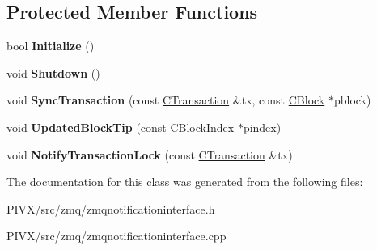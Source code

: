 \subsection*{Protected Member Functions}
\begin{DoxyCompactItemize}
\item 
\mbox{\label{class_c_z_m_q_notification_interface_a33097d2313d722ff02dd0f2c77f66d58}} 
bool {\bfseries Initialize} ()
\item 
\mbox{\label{class_c_z_m_q_notification_interface_a2eceddf8e9e3ac248ba922ef24eb8d3a}} 
void {\bfseries Shutdown} ()
\item 
\mbox{\label{class_c_z_m_q_notification_interface_a70a0919ccfbc5fb24cd16909c6d03c05}} 
void {\bfseries Sync\+Transaction} (const \mbox{\hyperlink{class_c_transaction}{C\+Transaction}} \&tx, const \mbox{\hyperlink{class_c_block}{C\+Block}} $\ast$pblock)
\item 
\mbox{\label{class_c_z_m_q_notification_interface_acd3d5dbbb9741847d161e55f875b83a5}} 
void {\bfseries Updated\+Block\+Tip} (const \mbox{\hyperlink{class_c_block_index}{C\+Block\+Index}} $\ast$pindex)
\item 
\mbox{\label{class_c_z_m_q_notification_interface_a82c8518d4631965696b31439fca225b6}} 
void {\bfseries Notify\+Transaction\+Lock} (const \mbox{\hyperlink{class_c_transaction}{C\+Transaction}} \&tx)
\end{DoxyCompactItemize}


The documentation for this class was generated from the following files\+:\begin{DoxyCompactItemize}
\item 
P\+I\+V\+X/src/zmq/zmqnotificationinterface.\+h\item 
P\+I\+V\+X/src/zmq/zmqnotificationinterface.\+cpp\end{DoxyCompactItemize}
